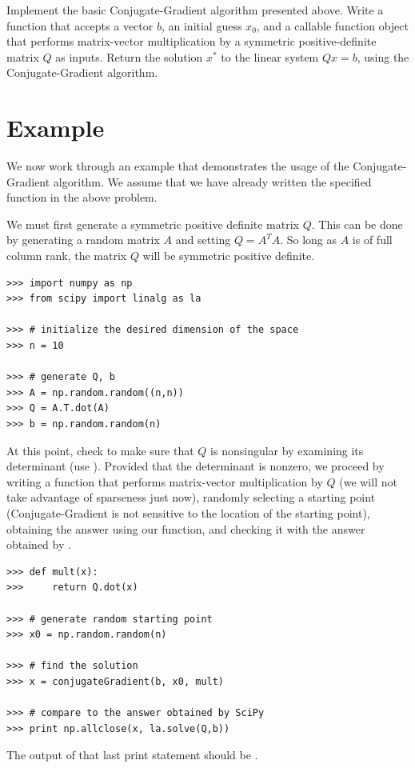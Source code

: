 \begin{problem}
Implement the basic Conjugate-Gradient algorithm presented above. Write a function  that accepts a vector $b$, an initial
guess $x_0$, and a callable function
object that performs matrix-vector multiplication by a symmetric positive-definite matrix $Q$ as inputs.
Return the solution $x^*$ to the linear system $Qx = b$, using the Conjugate-Gradient algorithm.
\end{problem}

\section*{Example}
We now work through an example that demonstrates the usage of the Conjugate-Gradient algorithm. We assume that we have already written
the specified function in the above problem.

We must first generate a symmetric positive definite matrix $Q$. This can be done by generating a random matrix $A$ and setting $Q = A^TA$.
So long as $A$ is of full column rank, the matrix $Q$ will be symmetric positive definite.
\begin{lstlisting}
>>> import numpy as np
>>> from scipy import linalg as la

>>> # initialize the desired dimension of the space
>>> n = 10

>>> # generate Q, b
>>> A = np.random.random((n,n))
>>> Q = A.T.dot(A)
>>> b = np.random.random(n)
\end{lstlisting}
At this point, check to make sure that $Q$ is nonsingular by examining its determinant (use ).
Provided that the determinant is nonzero, we proceed by writing a function that performs matrix-vector multiplication by $Q$ (we
will not take advantage of sparseness just now), randomly selecting a starting point (Conjugate-Gradient is not sensitive to the location of
the starting point), obtaining the answer using our function, and checking it with the answer obtained by .
\begin{lstlisting}
>>> def mult(x):
>>>     return Q.dot(x)

>>> # generate random starting point
>>> x0 = np.random.random(n)

>>> # find the solution
>>> x = conjugateGradient(b, x0, mult)

>>> # compare to the answer obtained by SciPy
>>> print np.allclose(x, la.solve(Q,b))
\end{lstlisting}
The output of that last print statement should be .

